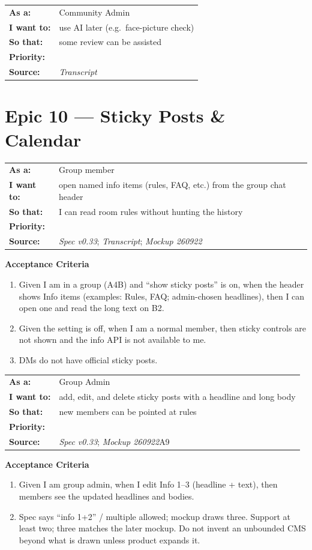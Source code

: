 \documentclass[11pt,a4paper]{article}
\makeatletter
\newcommand{\priPzero}{\colorbox{p0}{\makebox[4.6em]{\textcolor{white}{\scriptsize\bfseries P0 V1}}}}
\newcommand{\priPtwo}{\colorbox{p2}{\makebox[4.6em]{\textcolor{white}{\scriptsize\bfseries P2 Later}}}}
\newcommand{\srcSpec}{\textit{Spec v0.33}}
\newcommand{\srcTx}{\textit{Transcript}}
\newcommand{\srcMock}{\textit{Mockup 260922}}
\newenvironment{story}[1]{%
  \Needspace{10\baselineskip}%
  \vspace{0.7em}%
  \noindent
  \colorbox{navy}{\makebox[\dimexpr\textwidth-2\fboxsep\relax][l]{\textcolor{white}{\bfseries\ #1}}}%
  \par\vspace{0.35em}%
}{\par\vspace{0.55em}}
\newcommand{\storymeta}[5]{%
  \noindent
  \begin{tabularx}{\textwidth}{@{}>{\bfseries}l X@{}}
    As a: & #1 \\
    I want to: & #2 \\
    So that: & #3 \\
    Priority: & #4 \\
    Source: & #5 \\
  \end{tabularx}
  \par\vspace{0.3em}
}
\newcommand{\achead}{\noindent\textbf{Acceptance Criteria}\par}
\makeatother
\begin{document}
\begin{story}{VERIFY-006 --- AI-assisted verification later}
\storymeta{Community Admin}{use AI later (e.g.\ face-picture check)}{some review can be assisted}{\priPtwo}{\srcTx}
\end{story}

\section{Epic 10 --- Sticky Posts \& Calendar}

\begin{story}{STICKY-001 --- View sticky information in a group}
\storymeta{Group member}{open named info items (rules, FAQ, etc.) from the group chat header}{I can read room rules without hunting the history}{\priPzero}{\srcSpec; \srcTx; \srcMock}
\achead
\begin{enumerate}
  \item Given I am in a group (A4B) and ``show sticky posts'' is on, when the header shows Info items (examples: Rules, FAQ; admin-chosen headlines), then I can open one and read the long text on B2.
  \item Given the setting is off, when I am a normal member, then sticky controls are not shown and the info API is not available to me.
  \item DMs do not have official sticky posts.
\end{enumerate}
\end{story}

\begin{story}{STICKY-002 --- Admin create, edit, delete sticky posts}
\storymeta{Group Admin}{add, edit, and delete sticky posts with a headline and long body}{new members can be pointed at rules}{\priPzero}{\srcSpec; \srcMock A9}
\achead
\begin{enumerate}
  \item Given I am group admin, when I edit Info 1--3 (headline + text), then members see the updated headlines and bodies.
  \item Spec says ``info 1+2'' / multiple allowed; mockup draws three. Support at least two; three matches the later mockup. Do not invent an unbounded CMS beyond what is drawn unless product expands it.
\end{enumerate}
\end{story}
\end{document}
